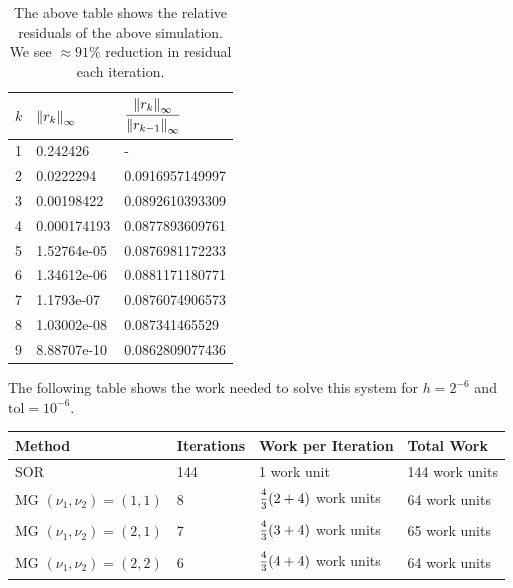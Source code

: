 \documentclass{article} %
\theoremstyle{plain}
\numberwithin{equation}{section} %
\numberwithin{figure}{section} %
\numberwithin{table}{section} %
\begin{document}
\begin{table}[ht!]
    \centering
    \begin{tabular}{||l|l|l||}
        \hline\hline
        $k$ & $\norm{r_k}_\infty$ & $\dfrac{\vphantom{\frac{1}{1}}\norm{r_k}_\infty}{\vphantom{\frac{1}{1}}\norm{r_{k-1}}_\infty}$   \\
        \hline\hline
        1 & 0.242426    & -                               \\\hline
        2 & 0.0222294   & 0.0916957149997                 \\\hline
        3 & 0.00198422  & 0.0892610393309                 \\\hline
        4 & 0.000174193 & 0.0877893609761                 \\\hline
        5 & 1.52764e-05 & 0.0876981172233                 \\\hline
        6 & 1.34612e-06 & 0.0881171180771                 \\\hline
        7 & 1.1793e-07  & 0.0876074906573                 \\\hline
        8 & 1.03002e-08 & 0.087341465529                  \\\hline
        9 & 8.88707e-10 & 0.0862809077436                 \\\hline
    \hline
    \end{tabular}
    \caption*{The above table shows the relative residuals of the above simulation.  We see $\approx91\%$ reduction in residual each iteration.}
\end{table}
\FloatBarrier
The following table shows the work needed to solve this system for $h = 2^{-6}$ and $\text{tol} = 10^{-6}$.
\begin{table}[ht!]
    \centering
    \begin{tabular}{||l|l|l|l||}
        \hline\hline
        Method & Iterations & Work per Iteration & Total Work \\
        \hline\hline
        SOR & 144 & 1 work unit & 144 work units \\\hline
        MG $(\nu_1,\nu_2) = (1,1)$ & 8 & $\frac{\vphantom{\frac{1}{1}}4}{3\vphantom{\frac{1}{1}}}\qty(2 + 4)$ work units & 64 work units\\\hline
        MG $(\nu_1,\nu_2) = (2,1)$ & 7 & $\frac{\vphantom{\frac{1}{1}}4}{3\vphantom{\frac{1}{1}}}\qty(3 + 4)$ work units & 65 work units\\\hline
        MG $(\nu_1,\nu_2) = (2,2)$ & 6 & $\frac{\vphantom{\frac{1}{1}}4}{3\vphantom{\frac{1}{1}}}\qty(4 + 4)$ work units & 64 work units\\\hline\hline
    \end{tabular}
\end{table}
\end{document}

